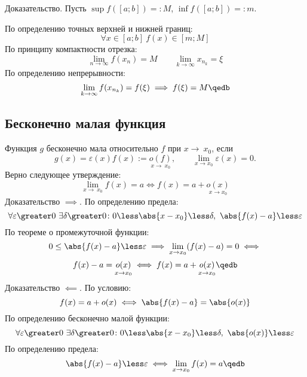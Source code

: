 {\bold Доказательство.} Пусть $\sup f([a;b])=:M$, $\inf f([a;b])=:m$.

По определению точных верхней и нижней границ:
$$\forall x\in[a;b]\ f(x)\in[m;M]$$
По принципу компактности отрезка:
$$\lim_{n\to\infty}f(x_n)=M\quad\quad\lim_{k\to\infty}x_{n_k}=\xi$$
По определению непрерывности:
$$\lim_{k\to\infty}f(x_{n_k})=f(\xi)\implies f(\xi)=M\qedb$$

\subsection{Бесконечно малая функция}

Функция $g$ {\ital бесконечно мала} относительно $f$ при $x\to\ x_0$, если
$$g(x)=\varepsilon(x)f(x):=\underset{x\to\ x_0}{o(f)},\quad\quad\lim_{x\to x_0}\varepsilon
(x)=0.$$
Верно следующее утверждение:
$$\lim_{x\to\ x_0}f(x)=a\iff f(x)=a+\underset{x\to x_0}{o(x)}$$
{\bold Доказательство $\implies$.} По определению предела:
$$\forall\varepsilon\greater 0\ \exists\delta\greater 0\colon 0\less\abs{x-x_0}\less
\delta,\ \abs{f(x)-a}\less\varepsilon$$
По теореме о промежуточной функции:
$$0\leq\abs{f(x)-a}\less\varepsilon\implies\lim_{x\to x_0}(f(x)-a)=0\iff$$
$$f(x)-a=\underset{x\to x_0}{o(x)}\iff f(x)=a+\underset{x\to x_0}{o(x)}\qedb$$
{\bold Доказательство $\impliedby$.} По условию:
$$f(x)=a+o(x)\iff\abs{f(x)-a}=\abs{o(x)}$$
По определению бесконечно малой функции:
$$\forall\varepsilon\greater 0\ \exists\delta\greater 0\colon 0\less\abs{x-x_0}\less
\delta,\ \abs{o(x)}\less\varepsilon$$
По определению предела:
$$\abs{f(x)-a}\less\varepsilon\iff\lim_{x\to x_0}f(x)=a\qedb$$
